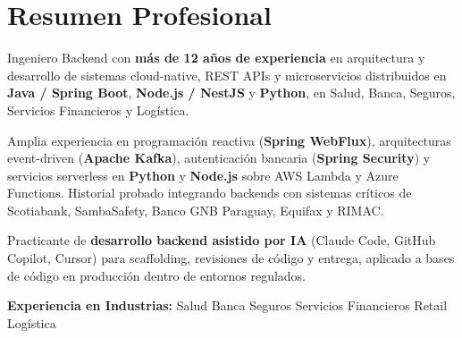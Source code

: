 
\section{Resumen Profesional}

{\small
Ingeniero Backend con \textbf{más de 12 años de experiencia} en arquitectura y desarrollo de
sistemas cloud-native, REST APIs y microservicios distribuidos en \textbf{Java / Spring Boot},
\textbf{Node.js / NestJS} y \textbf{Python}, en Salud, Banca, Seguros, Servicios Financieros y
Logística.

\vspace{3pt}
Amplia experiencia en programación reactiva (\textbf{Spring WebFlux}), arquitecturas event-driven
(\textbf{Apache Kafka}), autenticación bancaria (\textbf{Spring Security}) y servicios serverless
en \textbf{Python} y \textbf{Node.js} sobre AWS Lambda y Azure Functions. Historial probado
integrando backends con sistemas críticos de Scotiabank, SambaSafety, Banco GNB Paraguay,
Equifax y RIMAC.

\vspace{3pt}
Practicante de \textbf{desarrollo backend asistido por IA} (Claude Code, GitHub Copilot, Cursor)
para scaffolding, revisiones de código y entrega, aplicado a bases de código en producción dentro
de entornos regulados.
}

\vspace{4pt}
{\small\color{cvMuted}%
  \textbf{Experiencia en Industrias:}\enspace%
  Salud\enspace\textbar\enspace
  Banca\enspace\textbar\enspace
  Seguros\enspace\textbar\enspace
  Servicios Financieros\enspace\textbar\enspace
  Retail\enspace\textbar\enspace
  Logística%
}

